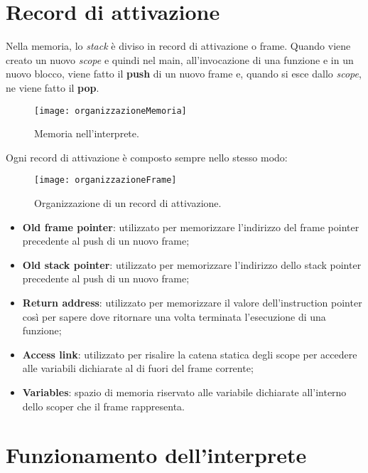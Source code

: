 \documentclass[../main.tex]{subfiles}
\begin{document}
\section{Record di attivazione}\label{s:record-di-attivazione}
Nella memoria, lo \textit{stack} \`e diviso in record di attivazione o frame. Quando viene creato un nuovo \textit{scope} e quindi nel main, all'invocazione di una funzione e in un nuovo blocco, viene fatto il \textbf{push} di un nuovo frame e, quando si esce dallo \textit{scope}, ne viene fatto il \textbf{pop}.
\begin{figure}[H]
    \centering
    \texttt{[image: organizzazioneMemoria]}
    \caption{Memoria nell'interprete.}
\end{figure}
Ogni record di attivazione \`e composto sempre nello stesso modo:
\begin{figure}[H]
    \centering
    \texttt{[image: organizzazioneFrame]}
    \caption{Organizzazione di un record di attivazione.}
\end{figure}
\begin{itemize}
    \item \textbf{Old frame pointer}: utilizzato per memorizzare l'indirizzo del frame pointer precedente al push di un nuovo frame;
    \item \textbf{Old stack pointer}: utilizzato per memorizzare l'indirizzo dello stack pointer precedente al push di un nuovo frame;
    \item \textbf{Return address}: utilizzato per memorizzare il valore dell'instruction pointer cos\`i per sapere dove ritornare una volta terminata l'esecuzione di una funzione;
    \item \textbf{Access link}: utilizzato per risalire la catena statica degli scope per accedere alle variabili dichiarate al di fuori del frame corrente;
    \item \textbf{Variables}: spazio di memoria riservato alle variabile dichiarate all'interno dello scoper che il frame rappresenta.
\end{itemize}

\section{Funzionamento dell'interprete}\label{s:funzionamento-interprete}
\end{document}
